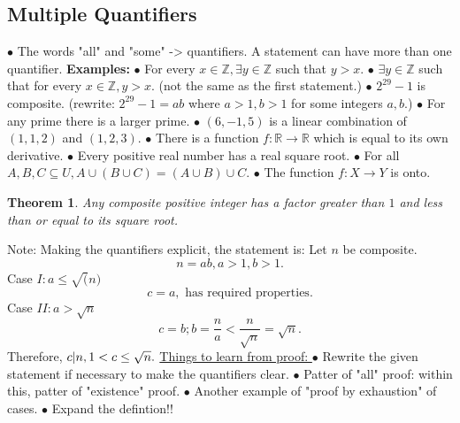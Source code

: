 \documentclass{article}
\newtheorem{theorem}{Theorem}                                       %
\begin{document}
\subsection{Multiple Quantifiers}
$\bullet $ The words "all" and "some" -> quantifiers. A statement can have more than one quantifier.
\newline
\newline
\textbf{Examples:}
\newline
$\bullet $ For every $x \in \mathbb{Z}, \exists y \in \mathbb{Z}$ such that $y > x$.
\newline
$\bullet $ $\exists y \in \mathbb{Z}$ such that for every $x \in \mathbb{Z}, y > x.$ (not the same as the first statement.)
\newline
$\bullet $ $2^29 - 1$ is composite. (rewrite: $2^29 - 1 = ab$ where $a > 1, b > 1$ for some integers $a, b$.)
\newline
$\bullet $ For any prime there is a larger prime.
\newline
$\bullet $ $(6, -1, 5)$ is a linear combination of $(1, 1, 2)$ and $(1, 2, 3).$
\newline
$\bullet $ There is a function $f: \mathbb{R} \rightarrow \mathbb{R}$ which is equal to its own derivative.
\newline
$\bullet $ Every positive real number has a real square root.
\newline
$\bullet $ For all $A, B, C \subseteq U, A \cup (B \cup C) = (A \cup B) \cup C.$
\newline
$\bullet $ The function $f : X \rightarrow Y$ is onto.
\newline
\newline
\begin{theorem}
  Any composite positive integer has a factor greater than $1$ and less than or equal to its square root.
\end{theorem}
Note: Making the quantifiers explicit, the statement is: 
\newline
\newline
{}  
\newline
\newline
Let $n$ be composite.
\newline
$$n = ab, a > 1, b > 1.$$
Case $I: a \leq \sqrt(n)$
$$c = a, \text{ has required properties}.$$
Case $II: a > \sqrt{n}$
$$c = b; b = \frac{n}{a} < \frac{n}{\sqrt{n}} = \sqrt{n}.$$
Therefore, $c \arrowvert n, 1 < c \leq \sqrt{n}.$
\newline
\newline
\underline{ Things to learn from proof: }
\newline
$\bullet $ Rewrite the given statement if necessary to make the quantifiers clear.
\newline
$\bullet $ Patter of "all" proof: within this, patter of "existence" proof.
\newline
$\bullet $ Another example of "proof by exhaustion" of cases.
\newline
$\bullet $ Expand the defintion!!
\newpage
\end{document}
